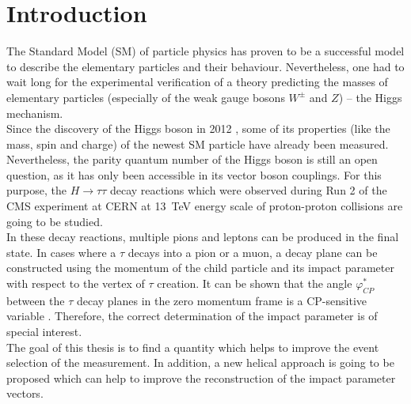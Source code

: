 \chapter{Introduction} %

\label{Chapter1} %

The Standard Model (SM) of particle physics has proven to be a successful model to describe the elementary particles and their behaviour. Nevertheless, one had to wait long for the experimental verification of a theory predicting the masses of elementary particles (especially of the weak gauge bosons $W^\pm$ and $Z$) -- the Higgs mechanism.\\
Since the discovery of the Higgs boson in 2012 \parencite{Higgs2,Higgs1}, some of its properties (like the mass, spin and charge) of the newest SM particle have already been measured. Nevertheless, the parity quantum number of the Higgs boson is still an open question, as it has only been accessible in its vector boson couplings. For this purpose, the $H\rightarrow\tau\tau$ decay reactions which were observed during Run 2 of the CMS experiment at CERN at \SI{13}{\tera\electronvolt} energy scale of proton-proton collisions are going to be studied.\\
In these decay reactions, multiple pions and leptons can be produced in the final state. In cases where a $\tau$ decays into a pion or a muon, a decay plane can be constructed using the momentum of the child particle and its impact parameter with respect to the vertex of $\tau$ creation. It can be shown that the angle $\varphi_{CP}^*$ between the $\tau$ decay planes in the zero momentum frame is a CP-sensitive variable  \parencite{Berge_1prong, Berge_CP_Prospects}. Therefore, the correct determination of the impact parameter is of special interest.\\
The goal of this thesis is to find a quantity which helps to improve the event selection of the measurement. In addition, a new helical approach is going to be proposed which can help to improve the reconstruction of the impact parameter vectors.